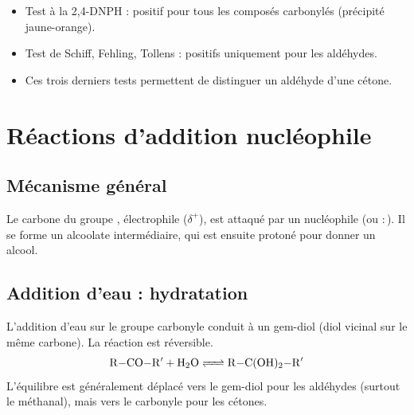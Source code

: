 \begin{aretenir}
\begin{itemize}
    \item Test à la 2,4-DNPH : positif pour tous les composés carbonylés (précipité jaune-orange).
    \item Test de Schiff, Fehling, Tollens : positifs uniquement pour les aldéhydes.
    \item Ces trois derniers tests permettent de distinguer un aldéhyde d'une cétone.
\end{itemize}
\end{aretenir}

\section{Réactions d'addition nucléophile}

\subsection{Mécanisme général}

\begin{propriete}
Le carbone du groupe , électrophile ($\delta^+$), est attaqué par un nucléophile  (ou $:$). Il se forme un alcoolate intermédiaire, qui est ensuite protoné pour donner un alcool.
\end{propriete}

\begin{illus}
\hspace{1cm}
\hspace{1cm}
\end{illus}

\subsection{Addition d'eau : hydratation}

\begin{propriete}
L'addition d'eau sur le groupe carbonyle conduit à un gem-diol (diol vicinal sur le même carbone). La réaction est réversible.
\[
\ce{R-CO-R$'$ + H2O <=> R-C(OH)2-R$'$}
\]
L'équilibre est généralement déplacé vers le gem-diol pour les aldéhydes (surtout le méthanal), mais vers le carbonyle pour les cétones.
\end{propriete}

